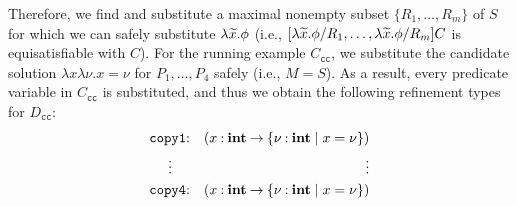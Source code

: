 Therefore, we find and substitute a maximal nonempty subset
\(\{R_1,\dots,R_m\}\) of \(S\) for which we can safely substitute
\(\lambda\widetilde{x}.\phi\) (i.e.,
\([\lambda\widetilde{x}.\phi/R_1,\dots,\lambda\widetilde{x}.\phi/R_m]C\) is
equisatisfiable with \(C\)).
%
%
For the running example \(C_{\texttt{cc}}\), we substitute the candidate
solution \(\lambda x \lambda \nu.x=\nu\) for \(P_1,\dots,P_4\) safely
(i.e., \(M=S\)).  As a result, every predicate variable in
\(C_{\texttt{cc}}\) is substituted, and thus we obtain the following
refinement types for \(D_{\texttt{cc}}\):
\begin{eqnarray*}
\texttt{copy1}&\mathbin{:}&(x\mathbin{:}{\mathbf{int}}\mathbin{\rightarrow}{\{{\nu\mathbin{:}\mathbf{int} \mid x=\nu}\}}) \\
\vdots\quad &&\qquad\qquad \vdots \\
\texttt{copy4}&\mathbin{:}&(x\mathbin{:}{\mathbf{int}}\mathbin{\rightarrow}{\{{\nu\mathbin{:}\mathbf{int} \mid x=\nu}\}})
\end{eqnarray*}


%
